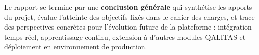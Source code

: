 \vspace{0.8em}
\noindent Le rapport se termine par une \textbf{conclusion générale} qui synthétise les apports du projet, évalue l'atteinte des objectifs fixés dans le cahier des charges, et trace des perspectives concrètes pour l'évolution future de la plateforme : intégration temps-réel, apprentissage continu, extension à d'autres modules QALITAS et déploiement en environnement de production.
